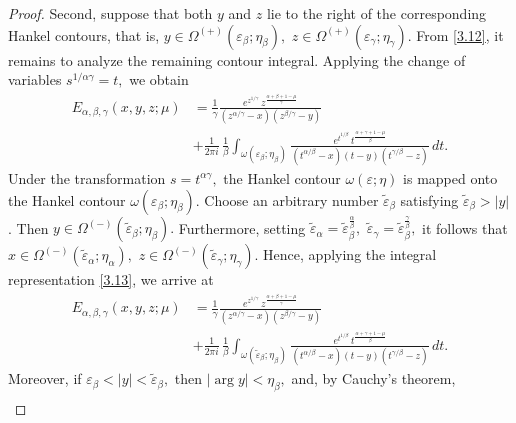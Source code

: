 \documentclass[10pt,a4paper]{amsart}
\begin{document}
\begin{proof}
Second, suppose that both $y$ and $z$ lie to the right of the corresponding Hankel contours, that is,
$
y\in\Omega^{(+)}(\varepsilon_\beta;\eta_\beta),
\,\,
z\in\Omega^{(+)}(\varepsilon_\gamma;\eta_\gamma).
$
From \eqref{3.12}, it remains to analyze the remaining contour integral. Applying the change of variables
$
s^{1/\alpha\gamma}=t,
$
we obtain
\begin{equation}\label{3.13}\begin{aligned}
E_{\alpha,\beta,\gamma}(x,y,z;\mu)
&=\frac{1}{\gamma}\frac{
e^{z^{1/\gamma}}
\,z^{\frac{\alpha+\beta+1-\mu}{\gamma}}}
{(z^{\alpha/\gamma}-x)(z^{\beta/\gamma}-y)}\\
&+
\frac{1}{2\pi i}\,
\frac{1}{\beta}
\int_{\omega(\varepsilon_\beta;\eta_\beta)}
\frac{
e^{t^{1/\beta}}
\,t^{\frac{\alpha+\gamma+1-\mu}{\beta}}
}
{
(t^{\alpha/\beta}-x)(t-y)(t^{\gamma/\beta}-z)
}
\,dt.\end{aligned}\end{equation}
Under the transformation
$
s=t^{\alpha\gamma},
$
the Hankel contour
$
\omega(\varepsilon;\eta)
$
is mapped onto the Hankel contour
$
\omega(\varepsilon_\beta;\eta_\beta).
$ Choose an arbitrary number $\widetilde{\varepsilon}_{\beta}$ satisfying
$\widetilde{\varepsilon}_{\beta}>|y|$. Then
$
y\in\Omega^{(-)}(\widetilde{\varepsilon}_{\beta};\eta_\beta).
$
Furthermore, setting
$
\widetilde{\varepsilon}_{\alpha}
=\widetilde{\varepsilon}_{\beta}^{\frac{\alpha}{\beta}},
\,\,
\widetilde{\varepsilon}_{\gamma}
=\widetilde{\varepsilon}_{\beta}^{\frac{\gamma}{\beta}},
$
it follows that
$
x\in\Omega^{(-)}(\widetilde{\varepsilon}_{\alpha};\eta_\alpha),
\,\,
z\in\Omega^{(-)}(\widetilde{\varepsilon}_{\gamma};\eta_\gamma).
$ Hence, applying the integral representation \eqref{3.13}, we arrive at
\begin{equation}\label{3.14}\begin{aligned}
E_{\alpha,\beta,\gamma}(x,y,z;\mu)
&=\frac{1}{\gamma}\frac{
e^{z^{1/\gamma}}
\,z^{\frac{\alpha+\beta+1-\mu}{\gamma}}}
{(z^{\alpha/\gamma}-x)(z^{\beta/\gamma}-y)}\\
&+
\frac{1}{2\pi i}\,
\frac{1}{\beta}
\int_{\omega(\widetilde{\varepsilon}_{\beta};\eta_\beta)}
\frac{
e^{t^{1/\beta}}
\,t^{\frac{\alpha+\gamma+1-\mu}{\beta}}
}
{
(t^{\alpha/\beta}-x)(t-y)(t^{\gamma/\beta}-z)
}
\,dt.\end{aligned}\end{equation}
Moreover, if
$
\varepsilon_\beta<|y|<\widetilde{\varepsilon}_{\beta},
$
then
$
|\arg y|<\eta_\beta,
$
and, by Cauchy's theorem,
\begin{equation}\label{3.15}\begin{aligned}

\end{aligned}
\end{equation}
\end{proof}
\end{document}
